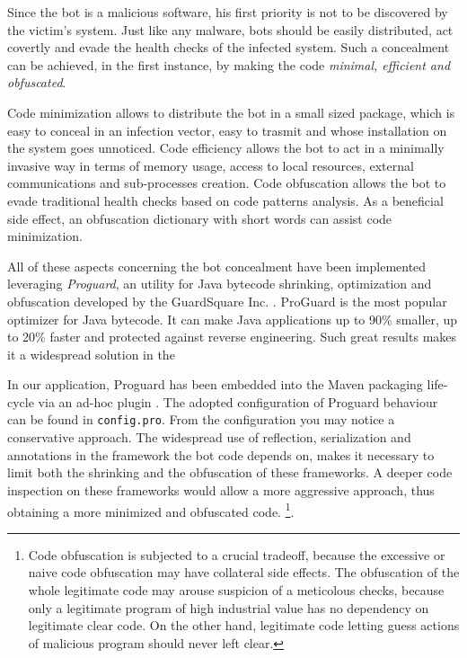 Since the bot is a malicious software, his first priority is not to be discovered by the victim's system. Just like any malware, bots should be easily distributed, act covertly and evade the health checks of the infected system. Such a concealment can be achieved, in the first instance, by making the code \textit{minimal, efficient and obfuscated}.

Code minimization allows to distribute the bot in a small sized package, which is easy to conceal in an infection vector, easy to trasmit and whose installation on the system goes unnoticed.
Code efficiency allows the bot to act in a minimally invasive way in terms of memory usage, access to local resources, external communications and sub-processes creation.
Code obfuscation allows the bot to evade traditional health checks based on code patterns analysis. As a beneficial side effect, an obfuscation dictionary with short words can assist code minimization.

All of these aspects concerning the bot concealment have been implemented leveraging \textit{Proguard}, an utility for Java bytecode shrinking, optimization and obfuscation developed by the GuardSquare Inc. \cite{proguard}. ProGuard is the most popular optimizer for Java bytecode. It can make Java applications up to 90\% smaller, up to 20\% faster and protected against reverse engineering\cite{guardsquare}. Such great results makes it a widespread solution in the

In our application, Proguard has been embedded into the Maven packaging life-cycle via an ad-hoc plugin \cite{proguard-maven-plugin}. The adopted configuration of Proguard behaviour can be found in \texttt{config.pro}. From the configuration you may notice a conservative approach. The widespread use of reflection, serialization and annotations in the framework the bot code depends on, makes it necessary to limit both the shrinking and the obfuscation of these frameworks. A deeper code inspection on these frameworks would allow a more aggressive approach, thus obtaining a more minimized and obfuscated code. \footnote{Code obfuscation is subjected to a crucial tradeoff, because the excessive or naive code obfuscation may have collateral side effects. The obfuscation of the whole legitimate code may arouse suspicion of a meticolous checks, because only a legitimate program of high industrial value has no dependency on legitimate clear code. On the other hand, legitimate code letting guess actions of malicious program should never left clear.}.


